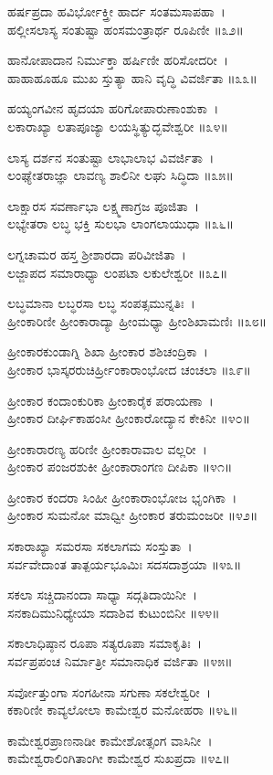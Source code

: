 {ಹರ್ಷಪ್ರದಾ ಹವಿರ್ಭೋಕ್ತ್ರೀ ಹಾರ್ದ ಸಂತಮಸಾಪಹಾ~।\\
ಹಲ್ಲೀಸಲಾಸ್ಯ ಸಂತುಷ್ಟಾ ಹಂಸಮಂತ್ರಾರ್ಥ ರೂಪಿಣೀ ॥೩೨॥

ಹಾನೋಪಾದಾನ ನಿರ್ಮುಕ್ತಾ ಹರ್ಷಿಣೀ ಹರಿಸೋದರೀ~।\\
ಹಾಹಾಹೂಹೂ ಮುಖ ಸ್ತುತ್ಯಾ ಹಾನಿ ವೃದ್ಧಿ ವಿವರ್ಜಿತಾ ॥೩೩॥

ಹಯ್ಯಂಗವೀನ ಹೃದಯಾ ಹರಿಗೋಪಾರುಣಾಂಶುಕಾ~।\\
ಲಕಾರಾಖ್ಯಾ ಲತಾಪೂಜ್ಯಾ ಲಯಸ್ಥಿತ್ಯುದ್ಭವೇಶ್ವರೀ ॥೩೪॥

ಲಾಸ್ಯ ದರ್ಶನ ಸಂತುಷ್ಟಾ ಲಾಭಾಲಾಭ ವಿವರ್ಜಿತಾ~।\\
ಲಂಘ್ಯೇತರಾಜ್ಞಾ ಲಾವಣ್ಯ ಶಾಲಿನೀ ಲಘು ಸಿದ್ಧಿದಾ ॥೩೫॥

ಲಾಕ್ಷಾರಸ ಸವರ್ಣಾಭಾ ಲಕ್ಷ್ಮಣಾಗ್ರಜ ಪೂಜಿತಾ~।\\
ಲಭ್ಯೇತರಾ ಲಬ್ಧ ಭಕ್ತಿ ಸುಲಭಾ ಲಾಂಗಲಾಯುಧಾ ॥೩೬॥

ಲಗ್ನಚಾಮರ ಹಸ್ತ ಶ್ರೀಶಾರದಾ ಪರಿವೀಜಿತಾ~।\\
ಲಜ್ಜಾಪದ ಸಮಾರಾಧ್ಯಾ ಲಂಪಟಾ ಲಕುಲೇಶ್ವರೀ ॥೩೭॥

ಲಬ್ಧಮಾನಾ ಲಬ್ಧರಸಾ ಲಬ್ಧ ಸಂಪತ್ಸಮುನ್ನತಿಃ~।\\
ಹ್ರೀಂಕಾರಿಣೀ ಹ್ರೀಂಕಾರಾದ್ಯಾ ಹ್ರೀಂಮಧ್ಯಾ ಹ್ರೀಂಶಿಖಾಮಣಿಃ ॥೩೮॥

ಹ್ರೀಂಕಾರಕುಂಡಾಗ್ನಿ ಶಿಖಾ ಹ್ರೀಂಕಾರ ಶಶಿಚಂದ್ರಿಕಾ~।\\
ಹ್ರೀಂಕಾರ ಭಾಸ್ಕರರುಚಿರ್ಹ್ರೀಂಕಾರಾಂಭೋದ ಚಂಚಲಾ ॥೩೯॥

ಹ್ರೀಂಕಾರ ಕಂದಾಂಕುರಿಕಾ ಹ್ರೀಂಕಾರೈಕ ಪರಾಯಣಾ~।\\
ಹ್ರೀಂಕಾರ ದೀರ್ಘಿಕಾಹಂಸೀ ಹ್ರೀಂಕಾರೋದ್ಯಾನ ಕೇಕಿನೀ ॥೪೦॥

ಹ್ರೀಂಕಾರಾರಣ್ಯ ಹರಿಣೀ ಹ್ರೀಂಕಾರಾವಾಲ ವಲ್ಲರೀ~।\\
ಹ್ರೀಂಕಾರ ಪಂಜರಶುಕೀ ಹ್ರೀಂಕಾರಾಂಗಣ ದೀಪಿಕಾ ॥೪೧॥

ಹ್ರೀಂಕಾರ ಕಂದರಾ ಸಿಂಹೀ ಹ್ರೀಂಕಾರಾಂಭೋಜ ಭೃಂಗಿಕಾ~।\\
ಹ್ರೀಂಕಾರ ಸುಮನೋ ಮಾಧ್ವೀ ಹ್ರೀಂಕಾರ ತರುಮಂಜರೀ ॥೪೨॥

ಸಕಾರಾಖ್ಯಾ ಸಮರಸಾ ಸಕಲಾಗಮ ಸಂಸ್ತುತಾ~।\\
ಸರ್ವವೇದಾಂತ ತಾತ್ಪರ್ಯಭೂಮಿಃ ಸದಸದಾಶ್ರಯಾ ॥೪೩॥

ಸಕಲಾ ಸಚ್ಚಿದಾನಂದಾ ಸಾಧ್ಯಾ ಸದ್ಗತಿದಾಯಿನೀ~।\\
ಸನಕಾದಿಮುನಿಧ್ಯೇಯಾ ಸದಾಶಿವ ಕುಟುಂಬಿನೀ ॥೪೪॥

ಸಕಾಲಾಧಿಷ್ಠಾನ ರೂಪಾ ಸತ್ಯರೂಪಾ ಸಮಾಕೃತಿಃ~।\\
ಸರ್ವಪ್ರಪಂಚ ನಿರ್ಮಾತ್ರೀ ಸಮಾನಾಧಿಕ ವರ್ಜಿತಾ ॥೪೫॥

ಸರ್ವೋತ್ತುಂಗಾ ಸಂಗಹೀನಾ ಸಗುಣಾ ಸಕಲೇಶ್ವರೀ~।\\
ಕಕಾರಿಣೀ ಕಾವ್ಯಲೋಲಾ ಕಾಮೇಶ್ವರ ಮನೋಹರಾ ॥೪೬॥

ಕಾಮೇಶ್ವರಪ್ರಾಣನಾಡೀ ಕಾಮೇಶೋತ್ಸಂಗ ವಾಸಿನೀ~।\\
ಕಾಮೇಶ್ವರಾಲಿಂಗಿತಾಂಗೀ ಕಾಮೇಶ್ವರ ಸುಖಪ್ರದಾ ॥೪೭॥

}
